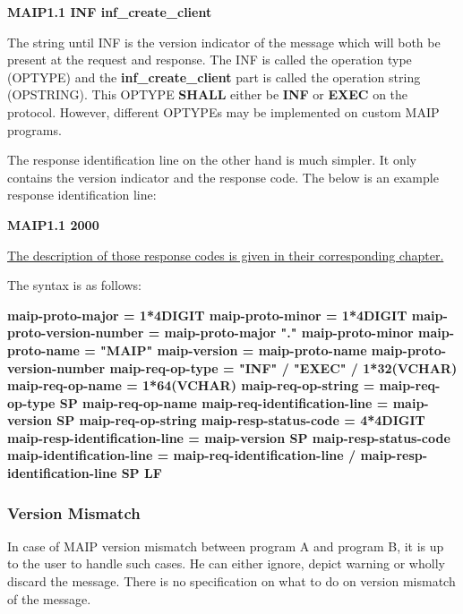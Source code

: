 \documentclass{article}
\begin{document}
\textbf{MAIP1.1 INF inf\_create\_client}\newline

The string until INF is the version indicator of the message which will both be present at the request and response. The INF is called the operation type (OPTYPE) and the \textbf{inf\_create\_client} part is called the operation string (OPSTRING). This OPTYPE \textbf{SHALL} either be \textbf{INF} or \textbf{EXEC} on the protocol. However, different OPTYPEs may be implemented on custom MAIP programs.\newline

The response identification line on the other hand is much simpler. It only contains the version indicator and the response code. The below is an example response identification line:\newline

\textbf{MAIP1.1 2000}\newline

\underline{The description of those response codes is given in their corresponding chapter.}\newline

The syntax is as follows:

\textbf{
\newline
maip-proto-major = 1*4DIGIT\newline
maip-proto-minor = 1*4DIGIT\newline
maip-proto-version-number = maip-proto-major "." maip-proto-minor\newline
maip-proto-name = "MAIP"\newline
maip-version = maip-proto-name maip-proto-version-number\newline
maip-req-op-type = "INF" / "EXEC" / 1*32(VCHAR)\newline
maip-req-op-name = 1*64(VCHAR)\newline
maip-req-op-string = maip-req-op-type SP maip-req-op-name\newline
maip-req-identification-line = maip-version SP maip-req-op-string\newline
maip-resp-status-code = 4*4DIGIT\newline
maip-resp-identification-line  = maip-version SP maip-resp-status-code\newline
maip-identification-line = maip-req-identification-line / maip-resp-identification-line SP LF\newline
}

\subsubsection{Version Mismatch}
In case of MAIP version mismatch between program A and program B, it is up to the user to handle such cases. He can either ignore, depict warning or wholly discard the message. There is no specification on what to do on version mismatch of the message.
\end{document}
